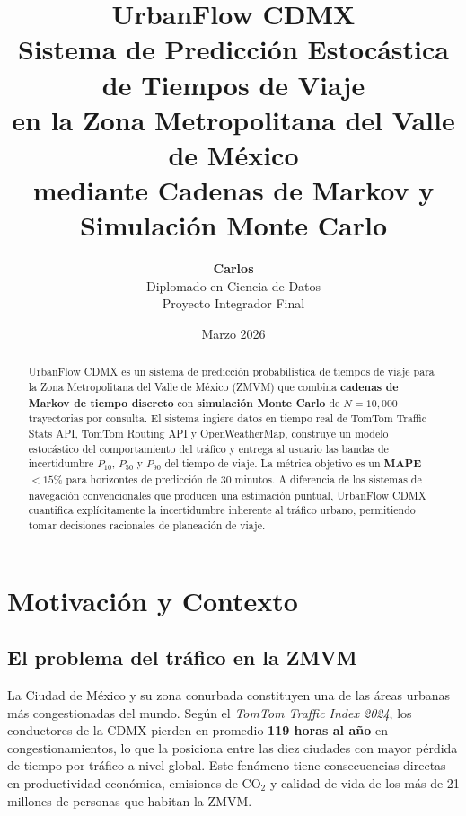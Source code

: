 \documentclass[12pt, a4paper]{article}
\title{%
    {\LARGE \textbf{UrbanFlow CDMX}}\\[4pt]
    {\large Sistema de Predicción Estocástica de Tiempos de Viaje\\
    en la Zona Metropolitana del Valle de México}\\[6pt]
    {\normalsize mediante Cadenas de Markov y Simulación Monte Carlo}
}
\author{%
    \textbf{Carlos}\\[4pt]
    \small Diplomado en Ciencia de Datos\\
    \small Proyecto Integrador Final
}
\date{\small Marzo 2026}
\theoremstyle{definition}
\begin{document}

\maketitle
\thispagestyle{empty}

\begin{abstract}
\noindent
UrbanFlow CDMX es un sistema de predicción probabilística de tiempos de viaje
para la Zona Metropolitana del Valle de México (ZMVM) que combina
\textbf{cadenas de Markov de tiempo discreto} con \textbf{simulación Monte Carlo}
de $N = 10{,}000$ trayectorias por consulta. El sistema ingiere datos en tiempo
real de TomTom Traffic Stats API, TomTom Routing API y OpenWeatherMap, construye
un modelo estocástico del comportamiento del tráfico y entrega al usuario las
bandas de incertidumbre $P_{10}$, $P_{50}$ y $P_{90}$ del tiempo de viaje.
La métrica objetivo es un \textbf{MAPE $< 15\%$} para horizontes de predicción
de 30 minutos. A diferencia de los sistemas de navegación convencionales que
producen una estimación puntual, UrbanFlow CDMX cuantifica explícitamente la
incertidumbre inherente al tráfico urbano, permitiendo tomar decisiones racionales
de planeación de viaje.
\end{abstract}

\vspace{0.5cm}
\tableofcontents
\newpage

\section{Motivación y Contexto}

\subsection{El problema del tráfico en la ZMVM}

La Ciudad de México y su zona conurbada constituyen una de las áreas urbanas
más congestionadas del mundo. Según el \textit{TomTom Traffic Index 2024},
los conductores de la CDMX pierden en promedio \textbf{119 horas al año} en
congestionamientos, lo que la posiciona entre las diez ciudades con mayor
pérdida de tiempo por tráfico a nivel global. Este fenómeno tiene consecuencias
directas en productividad económica, emisiones de $\text{CO}_2$ y calidad de
vida de los más de 21 millones de personas que habitan la ZMVM.
\end{document}
